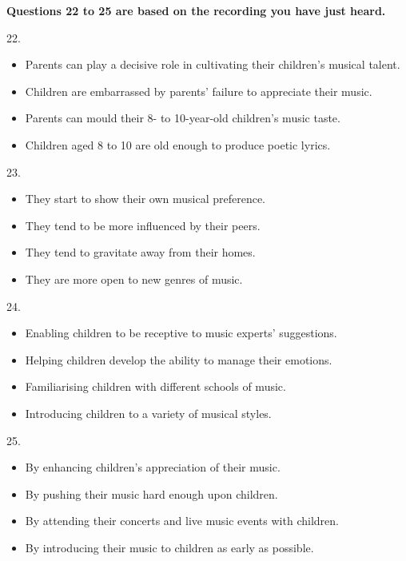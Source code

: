 \documentclass[UTF8,11pt]{ctexart}
\begin{document}
\textbf{Questions 22 to 25 are based on the recording you have just heard.}


22.


\begin{itemize}[leftmargin=2em,itemsep=.2em,topsep=.4em]\item[A.] Parents can play a decisive role in cultivating their children’s musical talent.
\item[B.] Children are embarrassed by parents’ failure to appreciate their music.
\item[C.] Parents can mould their 8- to 10-year-old children’s music taste.
\item[D.] Children aged 8 to 10 are old enough to produce poetic lyrics.
\end{itemize}

23.


\begin{itemize}[leftmargin=2em,itemsep=.2em,topsep=.4em]\item[A.] They start to show their own musical preference.
\item[B.] They tend to be more influenced by their peers.
\item[C.] They tend to gravitate away from their homes.
\item[D.] They are more open to new genres of music.
\end{itemize}

24.


\begin{itemize}[leftmargin=2em,itemsep=.2em,topsep=.4em]\item[A.] Enabling children to be receptive to music experts’ suggestions.
\item[B.] Helping children develop the ability to manage their emotions.
\item[C.] Familiarising children with different schools of music.
\item[D.] Introducing children to a variety of musical styles.
\end{itemize}

25.


\begin{itemize}[leftmargin=2em,itemsep=.2em,topsep=.4em]\item[A.] By enhancing children’s appreciation of their music.
\item[B.] By pushing their music hard enough upon children.
\item[C.] By attending their concerts and live music events with children.
\item[D.] By introducing their music to children as early as possible.
\end{itemize}
\end{document}
